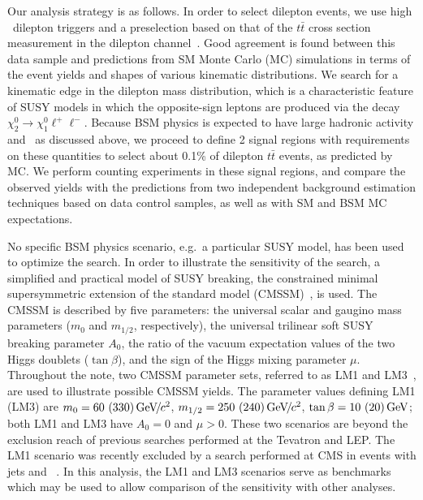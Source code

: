Our analysis strategy is as follows. In order to select dilepton events, we
use high \pt\ dilepton triggers and a preselection based 
on that of the $t\bar{t}$ cross section measurement in the dilepton channel~\cite{ref:top}.
Good agreement is found between this
data sample and predictions from SM Monte Carlo (MC) simulations in terms of the event yields
and shapes of various kinematic distributions. 
We search for a kinematic edge in the dilepton mass distribution, which is a characteristic
feature of SUSY models in which the opposite-sign leptons are produced via the decay 
$\chi_2^0 \to \chi_1^0 \ell^+\ell^-$.
Because BSM physics is expected to have large hadronic activity and \MET\ as discussed
above, we  proceed to define 2 signal regions
with requirements on these quantities to select about 0.1\% 
of dilepton $t\bar{t}$ events, as predicted by MC.
We perform counting experiments in these signal regions, and compare the observed yields
with the predictions from two 
independent background estimation techniques based on data control samples, 
as well as with SM and BSM MC expectations.

No specific BSM physics scenario, e.g.\ a particular SUSY model, has been used to optimize the search.
In order to illustrate the sensitivity of the search, a simplified and practical model of 
SUSY breaking, the constrained minimal supersymmetric
extension of the standard model (CMSSM)~\cite{CMSSM,CMSSM2}, is used. The CMSSM is described by
five parameters: the universal scalar and gaugino mass parameters ($m_0$ and $m_{1/2}$, respectively),
the universal trilinear soft SUSY breaking parameter $A_0$, the
ratio of the vacuum expectation values of the two Higgs doublets ($\tan\beta$), and the sign of the
Higgs mixing parameter $\mu$. 
Throughout the note, two CMSSM parameter sets, referred
to as LM1 and LM3~\cite{TDR}, are used to illustrate possible CMSSM yields. The parameter values
defining LM1 (LM3) are $m_0 = 60~(330) {\,\text{Ge\hspace{-.08em}V\hspace{-0.16em}/\hspace{-0.08em}}c^\text{2}}$, $m_{1/2} = 250~(240) {\,\text{Ge\hspace{-.08em}V\hspace{-0.16em}/\hspace{-0.08em}}c^\text{2}}$, $\tan\beta = 10~(20)\,\text{Ge\hspace{-.08em}V}$; 
both LM1 and LM3 have $A_0 = 0$ and $\mu > 0$.  These two scenarios are beyond the exclusion reach 
of previous searches performed at the Tevatron and LEP. The LM1 scenario was recently excluded 
by a search performed at CMS in events with jets and \MET~\cite{ref:RA1}. 
In this analysis, the LM1 and LM3 scenarios serve as benchmarks which 
may be used to allow comparison of the sensitivity with other analyses.


